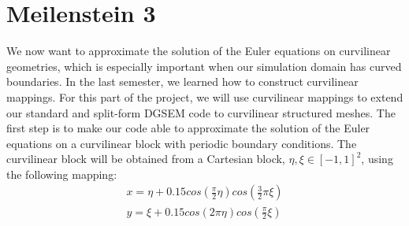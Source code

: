 \documentclass[11pt]{scrartcl}
\begin{document}
\section{Meilenstein 3}
We now want to approximate the solution of the Euler equations on curvilinear geometries, which is especially important when our simulation domain has curved boundaries. In the last semester, we learned how to construct curvilinear mappings. For this part of the project, we will use curvilinear mappings to extend our standard and split-form DGSEM code to curvilinear structured meshes. The first step is to make our code able to approximate the solution of the Euler equations on a curvilinear block with periodic boundary conditions. The curvilinear block will be obtained from a Cartesian block, $ \eta, \xi \in [-1, 1]^2$, using the following mapping:
\begin{align*}
x = \eta + 0.15 cos\left(\frac{\pi}{2}\eta \right)cos\left(\frac{3}{2}\pi \xi \right) \\
y = \xi + 0.15 cos\left(2\pi \eta \right) cos\left(\frac{\pi}{2}\xi \right)
\end{align*}
\end{document}

